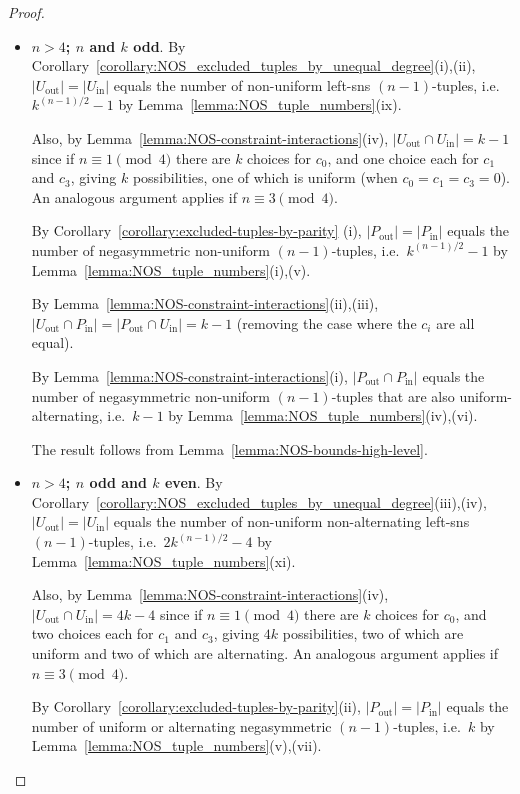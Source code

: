 \documentclass[a4paper,11pt]{article}
\theoremstyle{plain}
\theoremstyle{definition}
\theoremstyle{remark}
\begin{document}
\begin{proof}
\begin{itemize}
\item[iv)a)] {\bf $n>4$; $n$ and $k$ odd}.  By
    Corollary~\ref{corollary:NOS_excluded_tuples_by_unequal_degree}(i),(ii),
    $|U_{\text{out}}|=|U_{\text{in}}|$ equals the number of non-uniform left-sns
    $(n-1)$-tuples, i.e.\ $k^{(n-1)/2}-1$ by Lemma~\ref{lemma:NOS_tuple_numbers}(ix).

    Also, by Lemma~\ref{lemma:NOS-constraint-interactions}(iv), $|U_{\text{out}}\cap
    U_{\text{in}}|=k-1$ since if $n\equiv 1\pmod 4$ there are $k$ choices for $c_0$, and one
    choice each for $c_1$ and $c_3$, giving $k$ possibilities, one of which is uniform (when
    $c_0=c_1=c_3=0$). An analogous argument applies if $n\equiv 3 \pmod 4$.

    By Corollary~\ref{corollary:excluded-tuples-by-parity} (i),
    $|P_{\text{out}}|=|P_{\text{in}}|$ equals the number of negasymmetric non-uniform
    $(n-1)$-tuples, i.e.\ $k^{(n-1)/2}-1$ by Lemma~\ref{lemma:NOS_tuple_numbers}(i),(v).

    By Lemma~\ref{lemma:NOS-constraint-interactions}(ii),(iii), $|U_{\text{out}}\cap
    P_{\text{in}}|=|P_{\text{out}}\cap U_{\text{in}}|=k-1$ (removing the case where the $c_i$
    are all equal).

    By Lemma~\ref{lemma:NOS-constraint-interactions}(i), $|P_{\text{out}}\cap P_{\text{in}}|$
    equals the number of negasymmetric non-uniform $(n-1)$-tuples that are also
    uniform-alternating, i.e.\ $k-1$ by Lemma~\ref{lemma:NOS_tuple_numbers}(iv),(vi).

    The result follows from Lemma~\ref{lemma:NOS-bounds-high-level}.


\item[iv)b)] {\bf $n>4$; $n$ odd and $k$ even}.  By
    Corollary~\ref{corollary:NOS_excluded_tuples_by_unequal_degree}(iii),(iv),
    $|U_{\text{out}}|=|U_{\text{in}}|$ equals the number of non-uniform non-alternating
    left-sns $(n-1)$-tuples, i.e.\ $2k^{(n-1)/2}-4$ by Lemma~\ref{lemma:NOS_tuple_numbers}(xi).

    Also, by Lemma~\ref{lemma:NOS-constraint-interactions}(iv), $|U_{\text{out}}\cap
    U_{\text{in}}|=4k-4$ since if $n\equiv 1\pmod 4$ there are $k$ choices for $c_0$, and two
    choices each for $c_1$ and $c_3$, giving $4k$ possibilities, two of which are uniform and
    two of which are alternating. An analogous argument applies if $n\equiv 3 \pmod 4$.

    By Corollary~\ref{corollary:excluded-tuples-by-parity}(ii),
    $|P_{\text{out}}|=|P_{\text{in}}|$ equals the number of uniform or alternating
    negasymmetric $(n-1)$-tuples, i.e.\ $k$ by Lemma~\ref{lemma:NOS_tuple_numbers}(v),(vii).


\end{itemize}
\end{proof}
\end{document}
